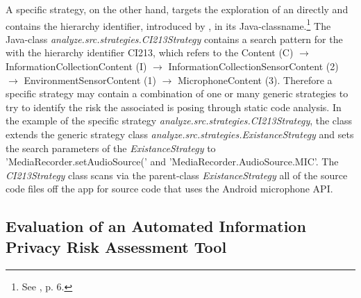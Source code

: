 A specific strategy, on the other hand, targets the exploration of an \ipp directly and contains the \ipp hierarchy identifier, introduced by \textcite{Dehling2016}, in its Java-classname.\footnote{See \cite{Dehling2016}, p. 6.}
The Java-class \textit{analyze.src.strategies.CI213\textunderscore Strategy} contains a search pattern for the \ipp with the hierarchy identifier CI213, which refers to the \ipp Content (C) $\rightarrow$ InformationCollectionContent (I) $\rightarrow$ InformationCollectionSensorContent (2) $\rightarrow$ EnvironmentSensorContent (1) $\rightarrow$ MicrophoneContent (3).
Therefore a specific strategy may contain a combination of one or many generic strategies to try to identify the risk the associated \ipp is posing through static code analysis.
In the example of the specific strategy \textit{analyze.src.strategies.CI213\textunderscore Strategy}, the class extends the generic strategy class \textit{analyze.src.strategies.ExistanceStrategy} and sets the search parameters of the \textit{ExistanceStrategy} to 'MediaRecorder.setAudioSource(' and 'MediaRecorder.AudioSource.MIC'.
The \textit{CI213\textunderscore Strategy} class scans via the parent-class \textit{ExistanceStrategy} all of the source code files off the app for source code that uses the Android microphone \acs{API}.

\subsection{Evaluation of an Automated Information Privacy Risk Assessment Tool}